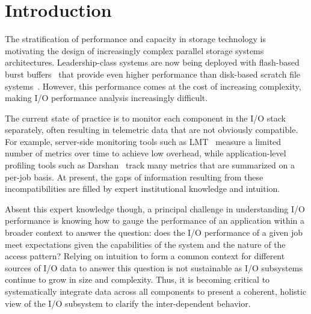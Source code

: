 \section{Introduction} \label{sec:introduction}

The stratification of performance and capacity in storage technology is motivating the design of increasingly complex parallel storage systems architectures.
Leadership-class systems are now being deployed with flash-based burst buffers~\cite{Henseler2016} that provide even higher performance than disk-based scratch file systems~\cite{Bhimji2016}.
However, this performance comes at the cost of increasing complexity, making I/O performance analysis increasingly difficult.

The current state of practice is to monitor each component in the I/O stack separately, often resulting in telemetric data that are not obviously compatible.
For example, server-side monitoring tools such as LMT~\cite{lmt} measure a limited number of metrics over time to achieve low overhead, while application-level profiling tools such as Darshan~\cite{carns200924} track many metrics that are summarized on a per-job basis.
At present, the gaps of information resulting from these incompatibilities are filled by expert institutional knowledge and intuition.

Absent this expert knowledge though, a principal challenge in understanding I/O performance is knowing how to gauge the performance of an application within a broader context to answer the question: 
does the I/O performance of a given job meet expectations given the capabilities of the system and the nature of the access pattern?
Relying on intuition to form a common context for different sources of I/O data to 
answer this question is not sustainable as I/O subsystems continue to grow in size and complexity.
Thus, it is becoming critical to systematically integrate data across all components to present a coherent, holistic view of the I/O subsystem to clarify the inter-dependent behavior.


